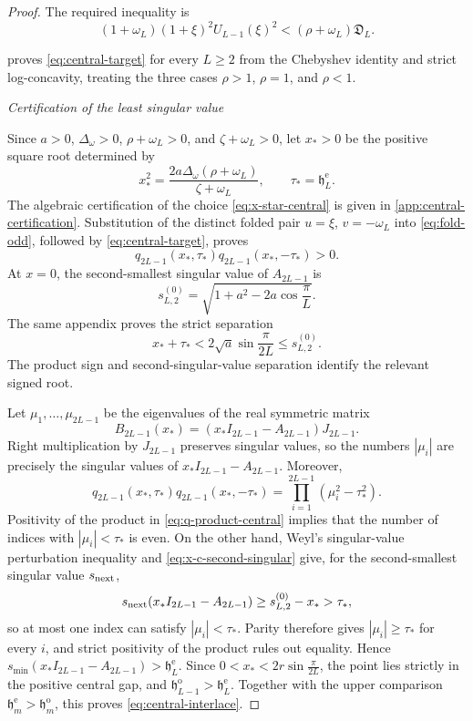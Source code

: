 \documentclass[10pt,twoside]{siamart1116}
\numberwithin{equation}{section}
\newcommand{\proofstage}[1]{%
  \par\medskip\noindent\textit{#1}\par\nobreak\smallskip}
\begin{document}
\begin{proof}
The required inequality is
\begin{equation}\label{eq:central-target}
 (1+\omega_L)(1+\xi)^2U_{L-1}(\xi)^2
 <(\rho+\omega_L)\mathfrak D_L.
\end{equation}

 proves \eqref{eq:central-target} for every
\(L\geq2\) from the Chebyshev identity and strict log-concavity, treating
the three cases \(\rho>1\), \(\rho=1\), and \(\rho<1\).

\proofstage{Certification of the least singular value}
Since \(a>0\), \(\Delta_\omega>0\), \(\rho+\omega_L>0\), and
\(\zeta+\omega_L>0\), let \(x_*>0\) be the positive square root determined
by
\begin{equation}\label{eq:x-star-central}
 x_*^2=\frac{2a\Delta_\omega(\rho+\omega_L)}{\zeta+\omega_L},
 \qquad \tau_*=\mathfrak h_L^{\mathrm e}.
\end{equation}
The algebraic certification of the choice \eqref{eq:x-star-central} is given in
\cref{app:central-certification}.  Substitution of the distinct folded pair
\(u=\xi\), \(v=-\omega_L\) into \eqref{eq:fold-odd}, followed by
\eqref{eq:central-target}, proves
\begin{equation}\label{eq:q-product-central}
 q_{2L-1}(x_*,\tau_*)q_{2L-1}(x_*,-\tau_*)>0.
\end{equation}
At \(x=0\), the second-smallest singular value of \(A_{2L-1}\) is
\[
 s_{L,2}^{(0)}
 =\sqrt{1+a^2-2a\cos\frac{\pi}{L}}.
\]
The same appendix proves the strict separation
\begin{equation}\label{eq:x-c-second-singular}
 x_*+\tau_*<2\sqrt a\sin\frac{\pi}{2L}\leq s_{L,2}^{(0)}.
\end{equation}
The product sign and second-singular-value separation identify the relevant
signed root.

Let \(\mu_1,\ldots,\mu_{2L-1}\) be the eigenvalues of the real symmetric
matrix
\[
 B_{2L-1}(x_*)=(x_*I_{2L-1}-A_{2L-1})J_{2L-1}.
\]
Right multiplication by \(J_{2L-1}\) preserves singular values, so the
numbers \(|\mu_i|\) are precisely the singular values of
\(x_*I_{2L-1}-A_{2L-1}\).  Moreover,
\[
 q_{2L-1}(x_*,\tau_*)q_{2L-1}(x_*,-\tau_*)
 =\prod_{i=1}^{2L-1}(\mu_i^2-\tau_*^2).
\]
Positivity of the product in \eqref{eq:q-product-central} implies that the
number of indices with \(|\mu_i|<\tau_*\) is even.  On the other hand, Weyl's
singular-value perturbation inequality and
\eqref{eq:x-c-second-singular} give, for the second-smallest singular value
\(s_{\rm next}\),
\[
 s_{\rm next}(x_*I_{2L-1}-A_{2L-1})
 \geq s_{L,2}^{(0)}-x_*>\tau_*,
\]
so at most one index can satisfy \(|\mu_i|<\tau_*\).  Parity therefore gives
\(|\mu_i|\geq\tau_*\) for every \(i\), and strict positivity of the product
rules out equality.  Hence
\(s_{\min}(x_*I_{2L-1}-A_{2L-1})>\mathfrak h_L^{\mathrm e}\).  Since
\(0<x_*<2r\sin\frac{\pi}{2L}\), the point lies strictly in the positive
central gap, and
\(\mathfrak h_{L-1}^{\mathrm o}>\mathfrak h_L^{\mathrm e}\).  Together
with the upper comparison
\(\mathfrak h_m^{\mathrm e}>\mathfrak h_m^{\mathrm o}\), this proves
\eqref{eq:central-interlace}.
\end{proof}
\end{document}
